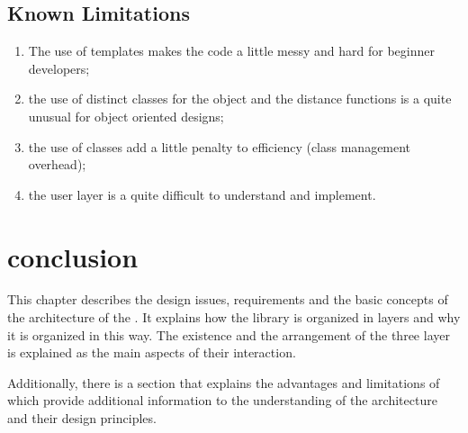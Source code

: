\subsection{Known Limitations}
\begin{enumerate}
	\item The use of templates makes the code a little messy and hard for beginner developers;
	\item the use of distinct classes for the object and the distance functions is a quite unusual for object oriented designs;
	\item the use of classes add a little penalty to efficiency (class management overhead);
	\item the user layer is a quite difficult to understand and implement.
\end{enumerate}

\section{conclusion}
\label{sec:arch.conclusion}

This chapter describes the design issues, requirements and the basic concepts of the architecture of the \libname. It explains how the library is organized in layers and why it is organized in this way.
The existence and the arrangement of the three layer is explained as the main aspects of their interaction.

Additionally, there is a section that explains the advantages and limitations of \libname{ }which provide additional information to the understanding of the architecture and their design principles.
